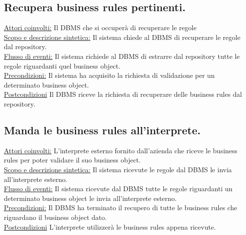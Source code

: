 \documentclass[11pt,titlepage,a4paper]{report}
\begin{document}
\subsection{Recupera business rules pertinenti.}
\underline{Attori coinvolti:} Il DBMS che si occuper\`a di recuperare le regole\\
\underline{Scopo e descrizione sintetica:} Il sistema chiede al DBMS di recuperare le regole dal repository.\\
\underline{Flusso di eventi:} Il sistema richiede al DBMS di estrarre dal repository tutte le regole riguardanti quel business object.\\
\underline{Precondizioni:} Il sistema ha acquisito la richiesta di validazione per un determinato business object.\\
\underline{Postcondizioni} Il DBMS riceve la richiesta di recuperare delle business rules dal repository.
\subsection{Manda le business rules all'interprete.}
\underline{Attori coinvolti:} L'interprete esterno fornito dall'azienda che riceve le business rules per poter validare il suo business object.\\
\underline{Scopo e descrizione sintetica:} Il sistema ricevute le regole dal DBMS le invia all'interprete esterno.\\
\underline{Flusso di eventi:} Il sistema ricevute dal DBMS tutte le regole riguardanti un determinato business object le invia all'interprete esterno.\\
\underline{Precondizioni:} Il DBMS ha terminato il recupero di tutte le business rules che riguardano il business object dato.\\
\underline{Postcondizioni} L'interprete utilizzer\`a le business rules appena ricevute.
\end{document}
